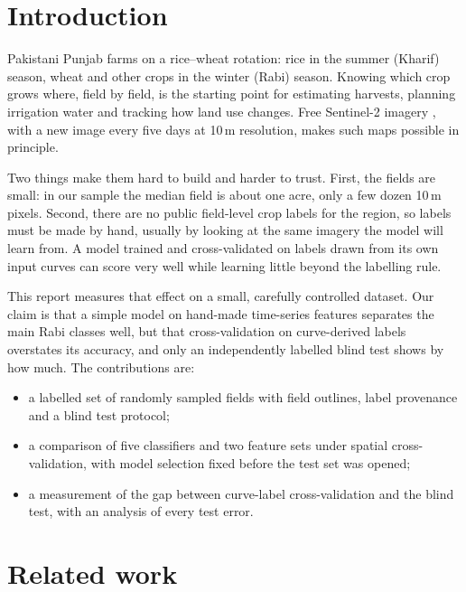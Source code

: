 \documentclass[10pt]{article}
\begin{document}
\section{Introduction}

Pakistani Punjab farms on a rice--wheat rotation: rice in the summer (Kharif) season, wheat and other
crops in the winter (Rabi) season. Knowing which crop grows where, field by field, is the starting
point for estimating harvests, planning irrigation water and tracking how land use changes. Free
Sentinel-2 imagery \cite{drusch2012sentinel2}, with a new image every five days at 10\,m resolution,
makes such maps possible in principle.

Two things make them hard to build and harder to trust. First, the fields are small: in our sample the
median field is about one acre, only a few dozen 10\,m pixels. Second, there are no public field-level
crop labels for the region, so labels must be made by hand, usually by looking at the same imagery the
model will learn from. A model trained and cross-validated on labels drawn from its own input curves
can score very well while learning little beyond the labelling rule.

This report measures that effect on a small, carefully controlled dataset. Our claim is that a simple
model on hand-made time-series features separates the main Rabi classes well, but that cross-validation
on curve-derived labels overstates its accuracy, and only an independently labelled blind test shows
by how much. The contributions are:
\begin{itemize}
  \item a labelled set of \NFields{} randomly sampled fields with field outlines, label provenance and a
        blind test protocol;
  \item a comparison of five classifiers and two feature sets under spatial cross-validation, with
        model selection fixed before the test set was opened;
  \item a measurement of the gap between curve-label cross-validation and the blind test, with an
        analysis of every test error.
\end{itemize}

\section{Related work}
\end{document}
